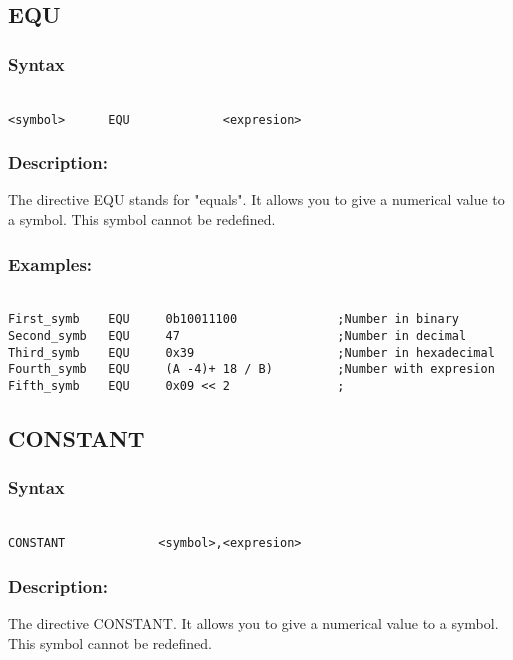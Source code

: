     \subsection{EQU}
        \subsubsection{Syntax}
        {
            ~\\
            \usecodefont        
            \verb'<symbol>      EQU             <expresion> '
        }
        \subsubsection{Description:}
                The directive EQU stands for "equals". It allows you to give a numerical value to a symbol. This symbol cannot be redefined.

        \subsubsection{Examples:}
        {
            ~\\
            \usecodefont
            \verb'First_symb    EQU     0b10011100              ;Number in binary'\\
            \verb'Second_symb   EQU     47                      ;Number in decimal'\\
            \verb'Third_symb    EQU     0x39                    ;Number in hexadecimal'\\
            \verb'Fourth_symb   EQU     (A -4)+ 18 / B)         ;Number with expresion'\\
            \verb'Fifth_symb    EQU     0x09 << 2               ;'\\
        }

    \subsection{CONSTANT}
        \subsubsection{Syntax}
        {
            ~\\
            \usecodefont
            \verb'CONSTANT             <symbol>,<expresion>'
        }
        \subsubsection{Description:}
                The directive CONSTANT. It allows you to give a numerical value to a symbol. This symbol cannot be redefined.

